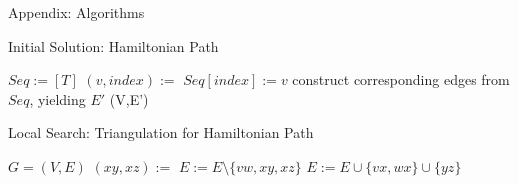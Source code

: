 \begin{frame}
  \begin{center}
      \LARGE Appendix: Algorithms
  \end{center}
\end{frame}

\begin{frame}{Initial Solution: Hamiltonian Path}
  \centering
  \begin{algorithm}[H]
    \small
    \caption{Nearest-insertion heuristic for Hamiltonian path construction.}
    \begin{algorithmic}[1]
      \State $Seq := [T]$
      \State $(v,index) := $ 
      \State $Seq[index] := v$
      \EndWhile
      \State construct corresponding edges from $Seq$, yielding $E'$
      \State \Return (V,E')
      \EndFunction
    \end{algorithmic}
  \end{algorithm}
\end{frame}
\begin{frame}{Local Search: Triangulation for Hamiltonian Path}
\begin{algorithm}[H]
  \small
  \caption{Local Search: Triangulation}
  \begin{algorithmic}[1]
    \State {}
    \EndFor
    \EndWhile
    \State \Return $G=(V,E)$
    \EndFunction
    \State
    \State $(xy, xz):= $ 
    \State $E := E\setminus\{vw, xy, xz\}$
    \State $E := E\cup \{vx, wx\} \cup \{yz\}$
    \EndIf
    \State \Return
    \EndFunction
  \end{algorithmic}
\end{algorithm}
\end{frame}
